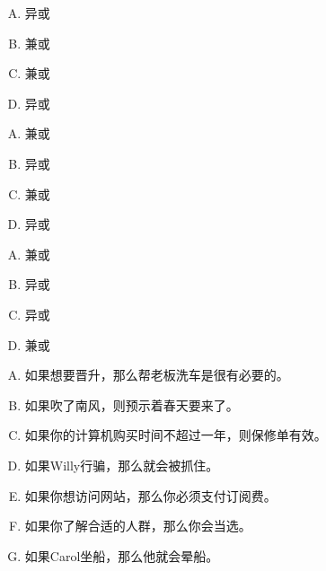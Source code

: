 {{        %
        \begin{practices}
            \begin{enumerate}[A.]
                \item 异或
                \item 兼或
                \item 兼或
                \item 异或
            \end{enumerate}
        \end{practices}

        \begin{practices}
            \begin{enumerate}[A.]
                \item 兼或
                \item 异或
                \item 兼或
                \item 异或
            \end{enumerate}
        \end{practices}

        \begin{practices}
            \begin{enumerate}[A.]
                \item 兼或
                \item 异或
                \item 异或
                \item 兼或
            \end{enumerate}
        \end{practices}

        \begin{practices}
            \begin{enumerate}[A.]
                \item 如果想要晋升，那么帮老板洗车是很有必要的。
                \item 如果吹了南风，则预示着春天要来了。
                \item 如果你的计算机购买时间不超过一年，则保修单有效。
                \item 如果Willy行骗，那么就会被抓住。
                \item 如果你想访问网站，那么你必须支付订阅费。
                \item 如果你了解合适的人群，那么你会当选。
                \item 如果Carol坐船，那么他就会晕船。
            \end{enumerate}
        \end{practices}

}}
